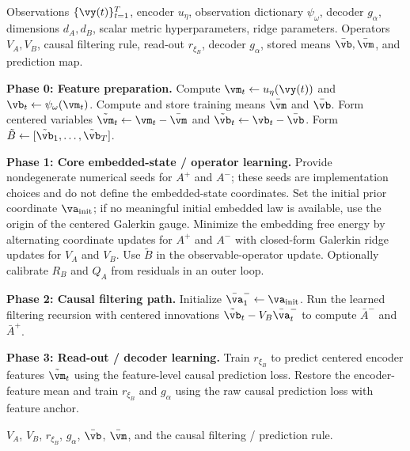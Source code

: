 \documentclass[twoside,11pt]{article}
\begin{document}
\begin{algorithm}[t]
\caption{Staged Embedding-Free-Energy Operator Learning}
\label{alg:staged_embedding_free_energy}
\begin{algorithmic}[1]
\Require Observations $\{\vy(t)\}_{t=1}^T$, encoder $u_\eta$,
observation dictionary $\psi_\omega$, decoder $g_\alpha$, dimensions
$d_A,d_B$, scalar metric hyperparameters, ridge parameters.
\Ensure Operators $V_A,V_B$, causal filtering rule, read-out
$r_{\xi_B}$, decoder $g_\alpha$, stored means $\bar{\vb},\bar{\vm}$,
and prediction map.

\State \textbf{Phase 0: Feature preparation.}
\State Compute $\vm_t\gets u_\eta(\vy(t))$ and
$\vb_t\gets \psi_\omega(\vm_t)$.
\State Compute and store training means $\bar{\vm}$ and $\bar{\vb}$.
\State Form centered variables
$\tilde{\vm}_t\gets\vm_t-\bar{\vm}$ and
$\tilde{\vb}_t\gets\vb_t-\bar{\vb}$.
\State Form $\tilde B\gets[\tilde{\vb}_1,\dots,\tilde{\vb}_T]$.

\State \textbf{Phase 1: Core embedded-state / operator learning.}
\State Provide nondegenerate numerical seeds for $A^+$ and $A^-$;
these seeds are implementation choices and do not define the
embedded-state coordinates.
\State Set the initial prior coordinate $\va_{\mathrm{init}}$; if no
meaningful initial embedded law is available, use the origin of the
centered Galerkin gauge.
\State Minimize the embedding free energy by alternating coordinate
updates for $A^+$ and $A^-$ with closed-form Galerkin ridge updates for
$V_A$ and $V_B$.
\State Use $\tilde B$ in the observable-operator update.
\State Optionally calibrate $R_B$ and $Q_A$ from residuals in an outer
loop.

\State \textbf{Phase 2: Causal filtering path.}
\State Initialize $\bar{\va}_1^-\gets\va_{\mathrm{init}}$.
\State Run the learned filtering recursion with centered innovations
$\tilde{\vb}_t-V_B\bar{\va}_t^-$ to compute $\bar A^-$ and $\bar A^+$.

\State \textbf{Phase 3: Read-out / decoder learning.}
\State Train $r_{\xi_B}$ to predict centered encoder features
$\tilde{\vm}_t$ using the feature-level causal prediction loss.
\State Restore the encoder-feature mean and train $r_{\xi_B}$ and
$g_\alpha$ using the raw causal prediction loss with feature anchor.

\State \Return $V_A$, $V_B$, $r_{\xi_B}$, $g_\alpha$,
$\bar{\vb}$, $\bar{\vm}$, and the causal filtering / prediction rule.
\end{algorithmic}
\end{algorithm}
\end{document}
